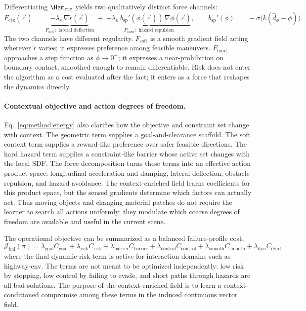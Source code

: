 Differentiating $\Ham_{\mathrm{ctx}}$ yields two qualitatively distinct
force channels:
\begin{equation}
F_{\mathrm{ctx}}(\vec c)
\;=\;
\underbrace{-\lambda_s\,\nabla \tilde r(\vec c)}_{F_{\mathrm{soft}}\,:\;\text{lateral deflection}}
\;+\;
\underbrace{-\lambda_h\, b_{\mathrm{sp}}'(\phi(\vec c))\,\nabla\phi(\vec c)}_{F_{\mathrm{hard}}\,:\;\text{hazard repulsion}},
\qquad
b_{\mathrm{sp}}'(\phi) \;=\; -\sigma\!\bigl(k(\hat d_\phi - \phi)\bigr).
\label{eq:method:force}
\end{equation}
The two channels have different regularity. $F_{\mathrm{soft}}$ is a
smooth gradient field acting wherever $\tilde r$ varies; it expresses
preference among feasible maneuvers. $F_{\mathrm{hard}}$ approaches a
step function as $\phi \to 0^+$; it expresses a near-prohibition on
boundary contact, smoothed enough to remain differentiable. Risk does
not enter the algorithm as a cost evaluated after the fact; it enters
as a force that reshapes the dynamics directly.

\paragraph{Contextual objective and action degrees of freedom.}
Eq.~\eqref{eq:method:energy} also clarifies how the objective and
constraint set change with context. The geometric term supplies a
goal-and-clearance scaffold. The soft context term supplies a
reward-like preference over safer feasible directions. The hard hazard
term supplies a constraint-like barrier whose active set changes with
the local SDF. The force decomposition turns these terms into an
effective action product space: longitudinal acceleration and damping,
lateral deflection, obstacle repulsion, and hazard avoidance. The context-enriched field
learns coefficients for this product space, but the sensed gradients
determine which factors can actually act. Thus moving objects and
changing material patches do not require the learner to search all
actions uniformly; they modulate which coarse degrees of freedom are
available and useful in the current scene.

The operational objective can be summarized as a balanced failure-profile
cost,
\begin{equation}
\mathcal{J}_{\mathrm{bal}}(\pi)
=
\lambda_{\mathrm{goal}}C_{\mathrm{goal}}
+\lambda_{\mathrm{risk}}C_{\mathrm{risk}}
+\lambda_{\mathrm{barrier}}C_{\mathrm{barrier}}
+\lambda_{\mathrm{control}}C_{\mathrm{control}}
+\lambda_{\mathrm{smooth}}C_{\mathrm{smooth}}
+\lambda_{\mathrm{dyn}}C_{\mathrm{dyn}},
\label{eq:method:balanced_objective}
\end{equation}
where the final dynamic-risk term is active for interaction domains such
as highway-env. The terms are not meant to be optimized independently:
low risk by stopping, low control by failing to evade, and short paths
through hazards are all bad solutions. The purpose of the context-enriched field is to
learn a context-conditioned compromise among these terms in the induced
continuous vector field.

